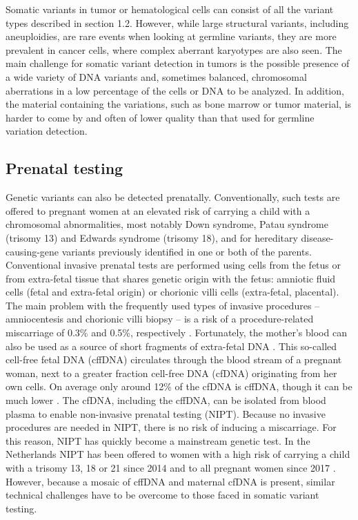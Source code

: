 Somatic variants in tumor or hematological cells can consist of all the variant types described in section 1.2. 
However, while large structural variants, including aneuploidies, are rare events when looking at germline variants, they are more prevalent in cancer cells, where complex aberrant karyotypes are also seen. 
The main challenge for somatic variant detection in tumors is the possible presence of a wide variety of DNA variants and, sometimes balanced, chromosomal aberrations in a low percentage of the cells or DNA to be analyzed. 
In addition, the material containing the variations, such as bone marrow or tumor material, is harder to come by and often of lower quality than that used for germline variation detection.


\subsection{Prenatal testing}
Genetic variants can also be detected prenatally. 
Conventionally, such tests are offered to pregnant women at an elevated risk of carrying a child with a chromosomal abnormalities, most notably Down syndrome, Patau syndrome (trisomy 13) and Edwards syndrome (trisomy 18), and for hereditary disease-causing-gene variants previously identified in one or both of the parents. 
Conventional invasive prenatal tests are performed using cells from the fetus or from extra-fetal tissue that shares genetic origin with the fetus: amniotic fluid cells (fetal and extra-fetal origin) or chorionic villi cells (extra-fetal, placental). 
The main problem with the frequently used types of invasive procedures – amniocentesis and chorionic villi biopsy – is a risk of a procedure-related miscarriage of 0.3\% and 0.5\%, respectively \cite{Beulen_2017}. 
Fortunately, the mother’s blood can also be used as a source of short fragments of extra-fetal DNA \cite{Lo_1997}. 
This so-called cell-free fetal DNA (cffDNA) circulates through the blood stream of a pregnant woman, next to a greater fraction cell-free DNA (cfDNA) originating from her own cells. 
On average only around 12\% of the cfDNA is cffDNA, though it can be much lower \cite{Ashoor_2012a}. 
The cfDNA, including the cffDNA, can be isolated from blood plasma to enable non-invasive prenatal testing (NIPT). 
Because no invasive procedures are needed in NIPT, there is no risk of inducing a miscarriage. For this reason, NIPT has quickly become a mainstream genetic test. 
In the Netherlands NIPT has been offered to women with a high risk of carrying a child with a trisomy 13, 18 or 21 since 2014 and to all pregnant women since 2017 \cite{meeroverNIPT_2018}. 
However, because a mosaic of cffDNA and maternal cfDNA is present, similar technical challenges have to be overcome to those faced in somatic variant testing.	 

